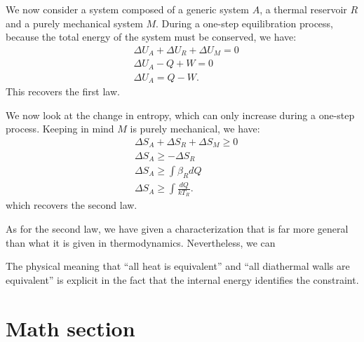 \documentclass[letterpaper]{article}
\begin{document}
We now consider a system composed of a generic system $A$, a thermal reservoir $R$ and a purely mechanical system $M$. During a one-step equilibration process, because the total energy of the system must be conserved, we have:
\begin{equation}
\begin{aligned}
&\Delta U_A + \Delta U_R + \Delta U_M = 0 \\
&\Delta U_A - Q + W = 0 \\
&\Delta U_A = Q - W.
\end{aligned}
\end{equation}
This recovers the first law.

We now look at the change in entropy, which can only increase during a one-step process. Keeping in mind $M$ is purely mechanical, we have:
\begin{equation}
\begin{aligned}
&\Delta S_A + \Delta S_R + \Delta S_M \geq 0 \\
&\Delta S_A \geq - \Delta S_R \\
&\Delta S_A \geq \int \beta_R dQ \\
&\Delta S_A \geq \int \frac{dQ}{k T_R}.
\end{aligned}
\end{equation}
which recovers the second law.


As for the second law, we have given a characterization that is far more general than what it is given in thermodynamics. Nevertheless, we can 


 The physical meaning that ``all heat is equivalent'' and ``all diathermal walls are equivalent'' is explicit in the fact that the internal energy identifies the constraint.

\section{Math section}
\end{document}
